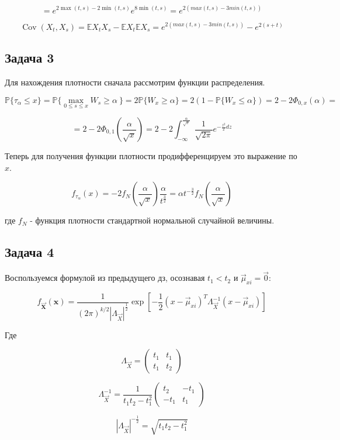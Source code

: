 \documentclass[a4paper,12pt]{article}
\def \mbb{\mathbb}
\def \cov{{\operatorname{Cov}}}
\def \P{\mbb{P}}
\def \E{\mbb{E}}
\begin{document}
\[ = e^{2 \max(t,s) - 2\min(t,s)} e^{8\min(t,s)} = e^{2(max(t,s) - 3 min(t,s))} \]

\[ \cov(X_t, X_s) = \E X_t X_s - \E X_t\E X_s =  e^{2(max(t,s) - 3 min(t,s))} - e^{2(s+t)} \]


\subsection{Задача 3}
Для нахождения плотности сначала рассмотрим функции распределения.

\[ \P\{ \tau_\alpha \le x \}  = \P\{ \max_{0\le s \le x}W_s \ge \alpha \ \}  = 2\P\{ W_x \ge \alpha \} = 2(1 - \P\{ W_x \le \alpha \}) = 2 - 2\Phi_{0,x}(\alpha) = \]

\[ =2 - 2\Phi_{0,1}\left(\frac{\alpha}{\sqrt{x}}\right) =  2 - 2\int_{-\infty}^{\frac{\alpha}{\sqrt{x}}}\frac{1}{\sqrt{2\pi}} e^{-\frac{z^2}{2} dz} \]

Теперь для получения функции плотности продифференцируем это выражение по $ x $.

\[ f_{\tau_\alpha}(x) = -2 f_N\left(\frac{\alpha}{\sqrt{x}}\right) \frac{\alpha}{t^\frac{3}{2}} = \alpha t^{-\frac{3}{2}} f_N\left(\frac{\alpha}{\sqrt{x}}\right)\]

где $ f_N $ - функция плотности стандартной нормальной случайной величины.

\subsection{Задача 4}

Воспользуемся формулой из предыдущего дз, осознавая $ t_1 < t_2 $ и $ \vec{\mu}_{xi} = \vec{0  } $:

\[
f_{\mathbf{\vec{X}}}(\boldsymbol{x})=\frac{1}{(2 \pi)^{k / 2}\left|\Lambda_{\vec{X}}\right|^{\frac{1}{2}}} \exp \left[-\frac{1}{2}\left(x-\vec{\mu}_{xi}\right)^T\Lambda_{\vec{X}}^{-1}\left(x-\vec{\mu}_{xi} \right)\right]
\]

Где 

\[ \Lambda_{\vec{X}}  = \begin{pmatrix}
t_1 & t_1 \\
t_1 & t_2
\end{pmatrix}\]

\[ \Lambda_{\vec{X}}^{-1}  = \frac{1}{t_1 t_2 - t_1^2} \begin{pmatrix}
t_2 & -t_1 \\
-t_1 & t_1
\end{pmatrix}\]

\[ |\Lambda_{\vec{X}}|^{-\frac{1}{2}} = \sqrt{t_1 t_2 - t_1^2} \]
\end{document}
